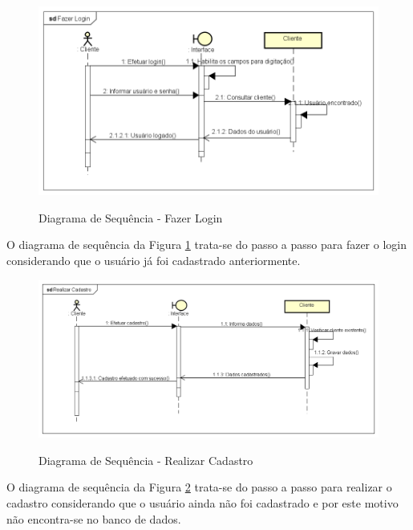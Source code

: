 \begin{figure}[H]
    \centering
    \caption{Diagrama de Sequência - Fazer Login}
    \includegraphics[width=1.0\textwidth]{./dados/figuras/7}
    \label{fig:figura-6}
\end{figure}
O diagrama de sequência da Figura \ref{fig:figura-6} trata-se do passo a passo para fazer o login considerando que o usuário já foi cadastrado anteriormente.

\begin{figure}[H]
    \centering
    \caption{Diagrama de Sequência - Realizar Cadastro}
    \includegraphics[width=1.0\textwidth]{./dados/figuras/8}
    \label{fig:figura-7}
\end{figure}
O diagrama de sequência da Figura \ref{fig:figura-7} trata-se do passo a passo para realizar o cadastro considerando que o usuário ainda não foi cadastrado e por este motivo não encontra-se no banco de dados.

